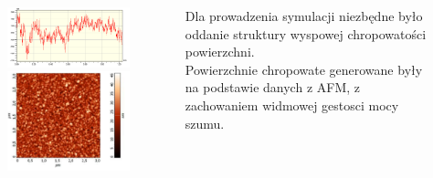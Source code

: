 \documentclass{beamer}
\begin{document}
\begin{frame}
	\begin{columns}
		\begin{column}{0.5\textwidth}
			\begin{figure}
				\includegraphics[width=\textwidth]{../images/multilayer/plp-afm-chropo-1d.png}\\
				\includegraphics[width=\textwidth]{../images/multilayer/plp-afm-chropo.png}\\
			\end{figure}
		\end{column}
		\begin{column}{0.5\textwidth}
			Dla prowadzenia symulacji niezbędne było oddanie struktury wyspowej chropowatości powierzchni. \\ 
			Powierzchnie chropowate generowane były na podstawie danych z AFM, z zachowaniem widmowej gestosci mocy szumu.\\
		\end{column}
	\end{columns}
		
\end{frame}
\end{document}
